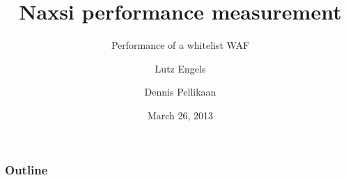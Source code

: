 \documentclass[11pt]{beamer}
\title{Naxsi performance measurement}
\subtitle{Performance of a whitelist WAF}
\author{Lutz Engels \and Dennis Pellikaan}
\institute[University of Amsterdam] %
{
{\large University of Amsterdam} \\
System and Network Engineering
}
\date{March 26, 2013}
\begin{document}
\begin{frame}
  \titlepage
\end{frame}


\begin{frame}
  \frametitle{Outline}
  \tableofcontents
\end{frame}




\end{document}
